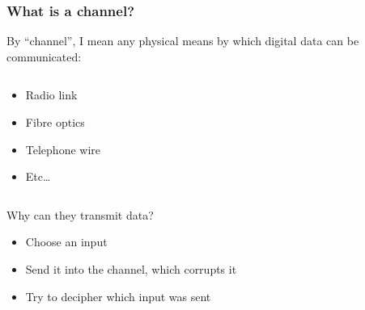 \documentclass[12pt]{beamer}
\begin{document}
\begin{frame}
\frametitle{What is a channel?}
By ``channel'', I mean any physical means by which digital data can be communicated:
\begin{columns}
  \begin{column}{5cm}
    \begin{itemize}
	\item Radio link
        \item Fibre optics
	\item Telephone wire
	\item Etc\ldots
    \end{itemize}
  \end{column}
  \begin{column}{5cm}
    \begin{figure}
    \end{figure}
  \end{column}
\end{columns}

Why can they transmit data?
\begin{itemize}
\item Choose an input
\item Send it into the channel, which corrupts it
\item Try to decipher which input was sent
\end{itemize}
\end{frame}
\end{document}
